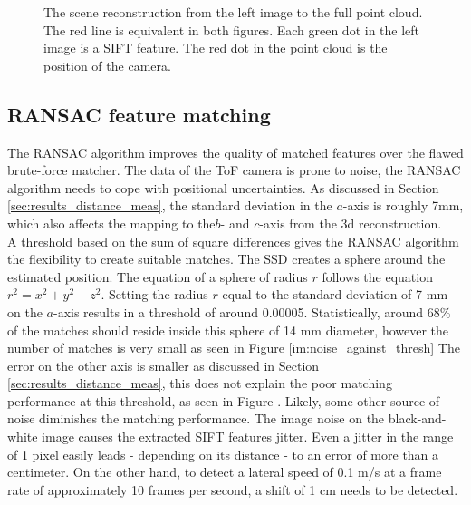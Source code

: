 \begin{figure}[H]
\begin{minipage}[b]{0.47\textwidth}
      \label{fig:linearity3d_cloud} 
    \end{minipage}
    \caption{The scene reconstruction from the left image to the full point cloud. The red line is equivalent in both figures. Each green dot in the left image is a SIFT feature. The red dot in the point cloud is the position of the camera.}
    \label{fig:linearity3d}
  \end{figure}

\subsection{RANSAC feature matching}
\label{sec:RANSAC_Results}
The RANSAC algorithm improves the quality of matched features over the flawed brute-force matcher. The data of the ToF camera is prone to noise, the RANSAC algorithm needs to cope with positional uncertainties. As discussed in Section \ref{sec:results_distance_meas}, the standard deviation in the $a$-axis is roughly 7mm, which also affects the mapping to the$b$- and $c$-axis from the 3d reconstruction.\\
A threshold based on the sum of square differences gives the RANSAC algorithm the flexibility to create suitable matches.
The SSD creates a sphere around the estimated position. The equation of a sphere of radius $r$ follows the equation $r^{2}=x^{2}+y^{2}+z^{2}$. Setting the radius $r$ equal to the standard deviation of 7 mm on the $a$-axis results in a threshold of around 0.00005. Statistically, around 68\% of the matches should reside inside this sphere of 14 mm diameter, however the number of matches is very small as seen in Figure \ref{im:noise_against_thresh} The error on the other axis is smaller as discussed in Section \ref{sec:results_distance_meas}, this does not explain the poor matching performance at this threshold, as seen in Figure . Likely, some other source of noise diminishes the matching performance. The image noise on the black-and-white image causes the extracted SIFT features jitter. Even a jitter in the range of 1 pixel easily leads - depending on its distance - to an error of more than a centimeter. On the other hand, to detect a lateral speed of 0.1 m/s at a frame rate of approximately 10 frames per second, a shift of 1 cm needs to be detected.
